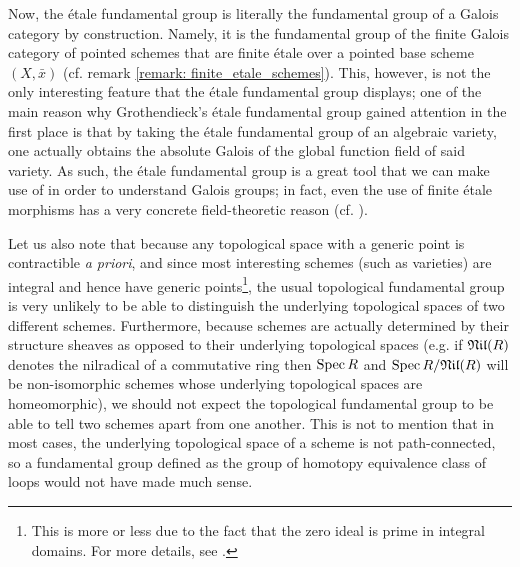             Now, the \'etale fundamental group is literally the fundamental group of a Galois category by construction. Namely, it is the fundamental group of the finite Galois category of pointed schemes that are finite \'etale over a pointed base scheme $(X, \bar{x})$ (cf. remark \ref{remark: finite_etale_schemes}). This, however, is not the only interesting feature that the \'etale fundamental group displays; one of the main reason why Grothendieck's \'etale fundamental group gained attention in the first place is that by taking the \'etale fundamental group of an algebraic variety, one actually obtains the absolute Galois of the global function field of said variety. As such, the \'etale fundamental group is a great tool that we can make use of in order to understand Galois groups; in fact, even the use of finite \'etale morphisms has a very concrete field-theoretic reason (cf. \cite[\href{https://stacks.math.columbia.edu/tag/00U3}{Tag 00U3}]{stacks}).
            
            Let us also note that because any topological space with a generic point is contractible \textit{a priori}, and since most interesting schemes (such as varieties) are integral and hence have generic points\footnote{This is more or less due to the fact that the zero ideal is prime in integral domains. For more details, see \cite[\href{https://stacks.math.columbia.edu/tag/01IS}{Tag 01IS}]{stacks}.}, the usual topological fundamental group is very unlikely to be able to distinguish the underlying topological spaces of two different schemes. Furthermore, because schemes are actually determined by their structure sheaves as opposed to their underlying topological spaces (e.g. if $\mathfrak{Nil}(R)$ denotes the nilradical of a commutative ring then $\operatorname{Spec} R$ and $\operatorname{Spec} R/\mathfrak{Nil}(R)$ will be non-isomorphic schemes whose underlying topological spaces are homeomorphic), we should not expect the topological fundamental group to be able to tell two schemes apart from one another. This is not to mention that in most cases, the underlying topological space of a scheme is not path-connected, so a fundamental group defined as the group of homotopy equivalence class of loops would not have made much sense.
            
